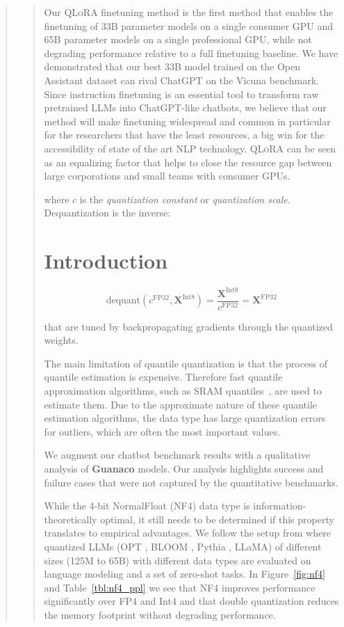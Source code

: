 \begin{quote}
\begin{quote}
Our \textsc{QLoRA} finetuning method is the first method that enables the finetuning of 33B parameter models on a single consumer GPU and 65B parameter models on a single professional GPU, while not degrading performance relative to a full finetuning baseline. We have demonstrated that our best 33B model trained on the Open Assistant dataset can rival ChatGPT on the Vicuna benchmark. Since instruction finetuning is an essential tool to transform raw pretrained LLMs into ChatGPT-like chatbots, we believe that our method will make finetuning widespread and common in particular for the researchers that have the least resources, a big win for the accessibility of state of the art NLP technology. \textsc{QLoRA} can be seen as an equalizing factor that helps to close the resource gap between large corporations and small teams with consumer GPUs.

where $c$ is the {\em quantization constant} or {\em quantization scale}. Dequantization is the inverse:

\section{Introduction}

\begin{equation}
    \text{dequant}(c^{\text{FP32}}, \mathbf{X}^{\text{Int8}}) = \frac{\mathbf{X}^{\text{Int8}}}{c^{\text{FP32}}} = \mathbf{X}^{\text{FP32}}
\end{equation}

that are tuned by backpropagating gradients through the quantized weights. 

The main limitation of quantile quantization is that the process of quantile estimation is expensive. Therefore fast quantile approximation algorithms, such as SRAM quantiles~\citep{dettmers2022optimizers}, are used to estimate them. Due to the approximate nature of these quantile estimation algorithms, the data type has large quantization errors for outliers, which are often the most important values.

We augment our chatbot benchmark results with a qualitative analysis of \textbf{Guanaco} models. Our analysis highlights success and failure cases that were not captured by the quantitative benchmarks.

While the 4-bit NormalFloat (NF4) data type is information-theoretically optimal, it still needs to be determined if this property translates to empirical advantages. We follow the setup from \citet{dettmers2022case} where quantized LLMs (OPT \citep{zhang2022opt}, BLOOM \cite{scao2022bloom}, Pythia \cite{biderman2023pythia}, LLaMA) of different sizes (125M to 65B) with different data types are evaluated on language modeling and a set of zero-shot tasks. In Figure~\ref{fig:nf4} and Table~\ref{tbl:nf4_ppl} we see that NF4 improves performance significantly over FP4 and Int4 and that double quantization reduces the memory footprint without degrading performance.


\end{quote}
\end{quote}
